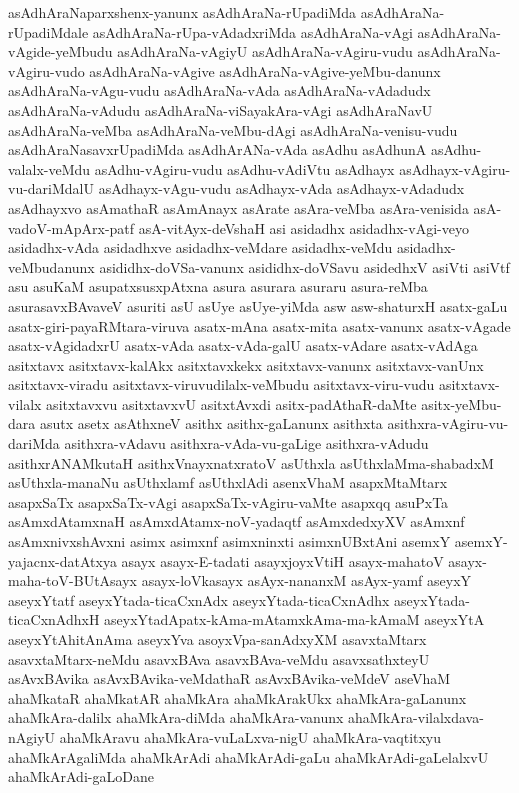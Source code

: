 {asAdhAraNaparxshenx-yanunx
asAdhAraNa-rUpadiMda
asAdhAraNa-rUpadiMdale
asAdhAraNa-rUpa-vAdadxriMda
asAdhAraNa-vAgi
asAdhAraNa-vAgide-yeMbudu
asAdhAraNa-vAgiyU
asAdhAraNa-vAgiru-vudu
asAdhAraNa-vAgiru-vudo
asAdhAraNa-vAgive
asAdhAraNa-vAgive-yeMbu-danunx
asAdhAraNa-vAgu-vudu
asAdhAraNa-vAda
asAdhAraNa-vAdadudx
asAdhAraNa-vAdudu
asAdhAraNa-viSayakAra-vAgi
asAdhAraNavU
asAdhAraNa-veMba
asAdhAraNa-veMbu-dAgi
asAdhAraNa-venisu-vudu
asAdhAraNasavxrUpadiMda
asAdhArANa-vAda
asAdhu
asAdhunA
asAdhu-valalx-veMdu
asAdhu-vAgiru-vudu
asAdhu-vAdiVtu
asAdhayx
asAdhayx-vAgiru-vu-dariMdalU
asAdhayx-vAgu-vudu
asAdhayx-vAda
asAdhayx-vAdadudx
asAdhayxvo
asAmathaR
asAmAnayx
asArate
asAra-veMba
asAra-venisida
asA-vadoV-mApArx-patf
asA-vitAyx-deVshaH
asi
asidadhx
asidadhx-vAgi-veyo
asidadhx-vAda
asidadhxve
asidadhx-veMdare
asidadhx-veMdu
asidadhx-veMbudanunx
asididhx-doVSa-vanunx
asididhx-doVSavu
asidedhxV
asiVti
asiVtf
asu
asuKaM
asupatxsusxpAtxna
asura
asurara
asuraru
asura-reMba
asurasavxBAvaveV
asuriti
asU
asUye
asUye-yiMda
asw
asw-shaturxH
asatx-gaLu
asatx-giri-payaRMtara-viruva
asatx-mAna
asatx-mita
asatx-vanunx
asatx-vAgade
asatx-vAgidadxrU
asatx-vAda
asatx-vAda-galU
asatx-vAdare
asatx-vAdAga
asitxtavx
asitxtavx-kalAkx
asitxtavxkekx
asitxtavx-vanunx
asitxtavx-vanUnx
asitxtavx-viradu
asitxtavx-viruvudilalx-veMbudu
asitxtavx-viru-vudu
asitxtavx-vilalx
asitxtavxvu
asitxtavxvU
asitxtAvxdi
asitx-padAthaR-daMte
asitx-yeMbu-dara
asutx
asetx
asAthxneV
asithx
asithx-gaLanunx
asithxta
asithxra-vAgiru-vu-dariMda
asithxra-vAdavu
asithxra-vAda-vu-gaLige
asithxra-vAdudu
asithxrANAMkutaH
asithxVnayxnatxratoV
asUthxla
asUthxlaMma-shabadxM
asUthxla-manaNu
asUthxlamf
asUthxlAdi
asenxVhaM
asapxMtaMtarx
asapxSaTx
asapxSaTx-vAgi
asapxSaTx-vAgiru-vaMte
asapxqq
asuPxTa
asAmxdAtamxnaH
asAmxdAtamx-noV-yadaqtf
asAmxdedxyXV
asAmxnf
asAmxnivxshAvxni
asimx
asimxnf
asimxninxti
asimxnUBxtAni
asemxY
asemxY-yajacnx-datAtxya
asayx
asayx-E-tadati
asayxjoyxVtiH
asayx-mahatoV
asayx-maha-toV-BUtAsayx
asayx-loVkasayx
asAyx-nananxM
asAyx-yamf
aseyxY
aseyxYtatf
aseyxYtada-ticaCxnAdx
aseyxYtada-ticaCxnAdhx
aseyxYtada-ticaCxnAdhxH
aseyxYtadApatx-kAma-mAtamxkAma-ma-kAmaM
aseyxYtA
aseyxYtAhitAnAma
aseyxYva
asoyxVpa-sanAdxyXM
asavxtaMtarx
asavxtaMtarx-neMdu
asavxBAva
asavxBAva-veMdu
asavxsathxteyU
asAvxBAvika
asAvxBAvika-veMdathaR
asAvxBAvika-veMdeV
aseVhaM
ahaMkataR
ahaMkatAR
ahaMkAra
ahaMkArakUkx
ahaMkAra-gaLanunx
ahaMkAra-dalilx
ahaMkAra-diMda
ahaMkAra-vanunx
ahaMkAra-vilalxdava-nAgiyU
ahaMkAravu
ahaMkAra-vuLaLxva-nigU
ahaMkAra-vaqtitxyu
ahaMkArAgaliMda
ahaMkArAdi
ahaMkArAdi-gaLu
ahaMkArAdi-gaLelalxvU
ahaMkArAdi-gaLoDane
}
